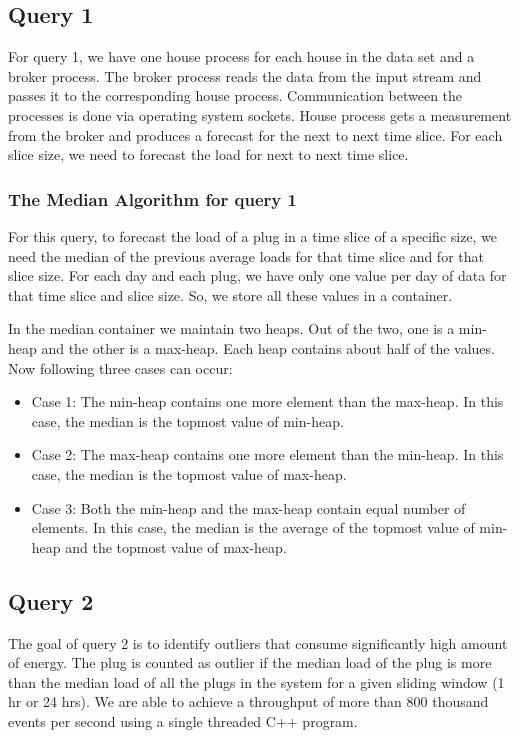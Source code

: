\subsection{Query 1}
For query 1, we have one house process for each house in the data set and a broker process. The broker process reads the data from the input stream and passes it to the corresponding house process. Communication between the processes is done via operating system sockets. House process gets a measurement from the broker and produces a forecast for the next to next time slice. 
For each slice size, we need to forecast the load for next to next time slice.
\subsubsection{The Median Algorithm for query 1}
For this query, to forecast the load of a plug in a time slice of a specific size, we need the median of the previous average loads for that time slice and for that slice size. For each day and each plug, we have only one value per day of data for that time slice and slice size. So, we store all these values in a container.

In the median container we maintain two heaps. Out of the two, one is a min-heap and the other is a max-heap. Each heap contains about half of the values. Now following three cases can occur:
\begin{itemize}
\item Case 1: The min-heap contains one more element than the max-heap. In this case, the median is the topmost value of min-heap.
\item Case 2: The max-heap contains one more element than the min-heap. In this case, the median is the topmost value of max-heap.
\item Case 3: Both the min-heap and the max-heap contain equal number of elements. In this case, the median is the average of the topmost value of min-heap and the topmost value of max-heap.

\end{itemize}
 
\subsection{Query 2}
The goal of query 2 is to identify outliers that consume significantly high amount of energy. The plug is counted as outlier if the median load of the plug is more than the median load of all the plugs in the system for a given sliding window (1 hr or 24 hrs). We are able to achieve a throughput of more than 800 thousand events per second using a single threaded C++ program.
 
